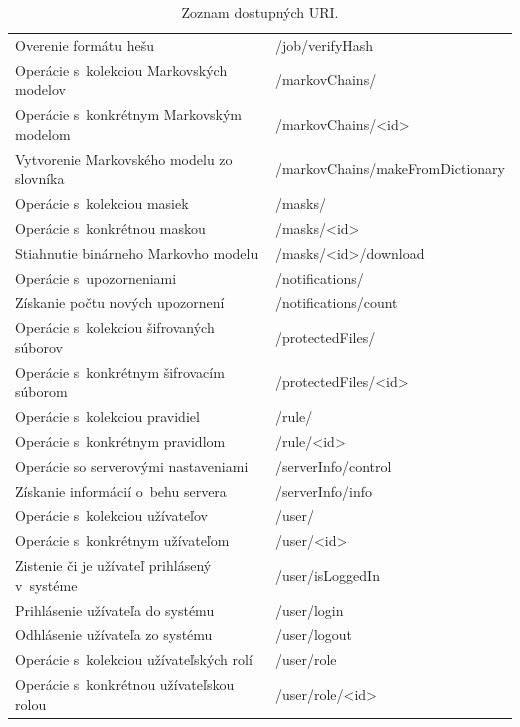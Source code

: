 \documentclass[zadani,slovak]{fitthesis}
\begin{document}
\begin{table}[h]
\begin{center}
\begin{tabular}{ |p{8cm}|p{7.4cm}|  }
          Overenie formátu hešu & /job/verifyHash \\
          Operácie s~kolekciou Markovských modelov & /markovChains/ \\
          Operácie s~konkrétnym Markovským modelom & /markovChains/<id> \\
          Vytvorenie Markovského modelu zo slovníka & /markovChains/makeFromDictionary \\
          Operácie s~kolekciou masiek & /masks/ \\
          Operácie s~konkrétnou maskou & /masks/<id> \\
          Stiahnutie binárneho Markovho modelu & /masks/<id>/download \\
          Operácie s~upozorneniami & /notifications/ \\
          Získanie počtu nových upozornení & /notifications/count \\
          Operácie s~kolekciou šifrovaných súborov & /protectedFiles/ \\
          Operácie s~konkrétnym šifrovacím súborom & /protectedFiles/<id> \\
          Operácie s~kolekciou pravidiel & /rule/ \\
          Operácie s~konkrétnym pravidlom & /rule/<id> \\
          Operácie so serverovými nastaveniami & /serverInfo/control \\
          Získanie informácií o~behu servera & /serverInfo/info \\
          Operácie s~kolekciou užívateľov & /user/ \\
          Operácie s~konkrétnym užívateľom & /user/<id> \\
          Zistenie či je užívateľ prihlásený v~systéme & /user/isLoggedIn \\
          Prihlásenie užívateľa do systému & /user/login \\
          Odhlásenie užívateľa zo systému & /user/logout \\
          Operácie s~kolekciou užívateľských rolí & /user/role \\
          Operácie s~konkrétnou užívateľskou rolou & /user/role/<id> \\
         \hline
        \end{tabular}
      \caption{Zoznam dostupných URI.}
      \label{zoznamURItable}
  \end{center}
\end{table}
\end{document}
